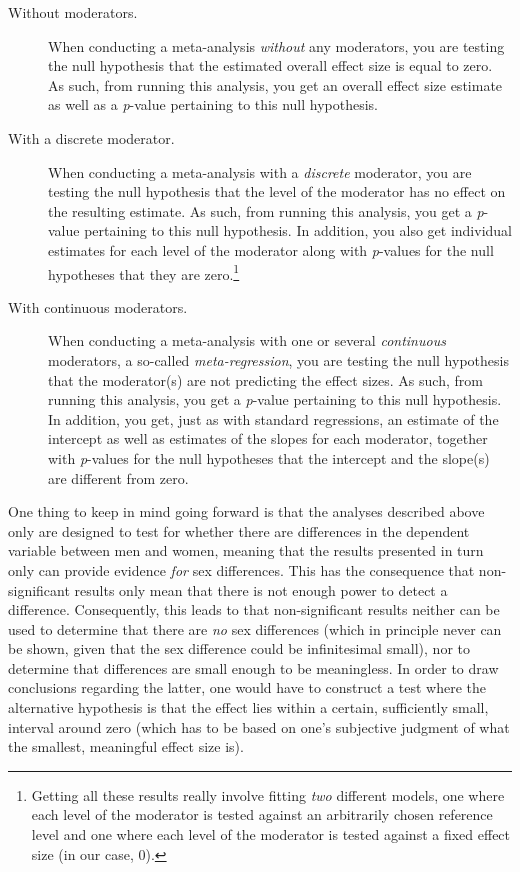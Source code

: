 \begin{description}

\item [Without moderators.] When conducting a meta-analysis \emph{without} any moderators, you are testing the null hypothesis that the estimated overall effect size is equal to zero. As such, from running this analysis, you get an overall effect size estimate as well as a \emph{p}-value pertaining to this null hypothesis.

\item [With a discrete moderator.] When conducting a meta-analysis with a \emph{discrete} moderator, you are testing the null hypothesis that the level of the moderator has no effect on the resulting estimate. As such, from running this analysis, you get a \emph{p}-value pertaining to this null hypothesis. In addition, you also get individual estimates for each level of the moderator along with \emph{p}-values for the null hypotheses that they are zero.\footnote{Getting all these results really involve fitting \emph{two} different models, one where each level of the moderator is tested against an arbitrarily chosen reference level and one where each level of the moderator is tested against a fixed effect size (in our case, 0).}

\item [With continuous moderators.] When conducting a meta-analysis with one or several \emph{continuous} moderators, a so-called \emph{meta-regression}, you are testing the null hypothesis that the moderator(s) are not predicting the effect sizes. As such, from running this analysis, you get a \emph{p}-value pertaining to this null hypothesis. In addition, you get, just as with standard regressions, an estimate of the intercept as well as estimates of the slopes for each moderator, together with \emph{p}-values for the null hypotheses that the intercept and the slope(s) are different from zero. \end{description}

One thing to keep in mind going forward is that the analyses described above only are designed to test for whether there are differences in the dependent variable between men and women, meaning that the results presented in turn only can provide evidence \emph{for} sex differences. This has the consequence that non-significant results only mean that there is not enough power to detect a difference. Consequently, this leads to that non-significant results neither can be used to determine that there are \emph{no} sex differences (which in principle never can be shown, given that the sex difference could be infinitesimal small), nor to determine that differences are small enough to be meaningless. In order to draw conclusions regarding the latter, one would have to construct a test where the alternative hypothesis is that the effect lies within a certain, sufficiently small, interval around zero (which has to be based on one's subjective judgment of what the smallest, meaningful effect size is).

